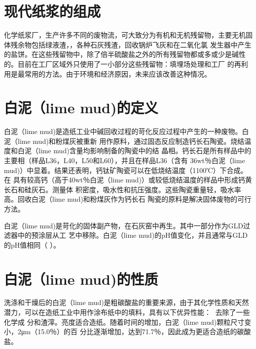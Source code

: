 \documentclass[11pt]{article}
\begin{document}
\section{现代纸浆的组成}
\label{sec:org1eb26ad}
化学纸浆厂，生产许多不同的废物流，可大致分为有机和无机残留物，主要无机固体残余物包括绿液渣，，各种石灰残渣，回收锅炉飞灰和在二氧化氯
发生器中产生的盐饼。在这些残留物中，除了倍半硫酸盐之外的所有残留物都或多或少是碱性
的。目前在工厂区域外只使用了一小部分这些残留物：填埋场处理和工厂
的再利用是最常用的方法。由于环境和经济原因，未来应该改善这种情况。\cite{Kinnarinen_2016}

\section{白泥（lime mud)的定义}
\label{sec:orgf60a219}
白泥（lime mud)是造纸工业中碱回收过程的苛化反应过程中产生的一种废物。白泥（lime mud)和粉煤灰被重新
用作原料，通过固态反应制造钙长石陶瓷。烧结温度和白泥（lime mud)含量均影响制备的陶瓷中的结
晶相。钙长石是所有样品中的主要相（样品L36，L40，L50和L60），并且在样品L36（含有
36wt％白泥（lime mud)）中显着。结果还表明，钙钛矿陶瓷可以在低烧结温度（1100℃）下合成。在
具有较高钙（高于40wt％白泥（lime mud)）或较低烧结温度的样品中形成钙黄长石和硅灰石。测量体
积密度，吸水性和抗压强度。这些陶瓷重量轻，吸水率高。回收白泥（lime mud)和粉煤灰作为钙长石
陶瓷的原料是解决固体废物的可行方法。 \cite{qin15_recyc_lime_mud_fly_ash}

白泥（lime mud)是苛化的固体副产物，在石灰窑中再生。其中一部分作为GLD过滤器中的预涂层从工
艺中移除。白泥（lime mud)的pH值变化，并且通常与GLD的pH值相同（
\cite{sthiannopkao09_utiliz_pulp_paper_indus_wastes}）。


\section{白泥（lime mud)的性质}
\label{sec:orga911ae8}
洗涤和干燥后的白泥（lime mud)是粗碳酸盐的重要来源，由于其化学性质和天然潜力，可以在造纸工业中用作涂布纸中的填料，具有以下优异性能： 去除了一些化学成
分和渣滓。亮度适合造纸。随着时间的增加，白泥（lime mud)颗粒尺寸变小，2μm（15.0％）的百
分比逐渐增加，达到71.7％，因此成为更适合造纸的碳酸盐。\cite{article}


\nocite{poykio14_evaluat_bio_acces_non_proces, maekitalo14_charac_green_liquor_dregs_poten, jia13_use_amend_tailin_as_mine_waste_cover
, jia14_metal_mobil_tailin_cover_with, edmondson14_urban_cultiv_allot_maint_soil, buruberri15_prepar_clink_from_paper_pulp_indus_wastes,
 brunelle15_evaluat_impac_risin_fertil_prices_crop_yield, andreola11_model_simul_analy_react_system,
  ragnvaldsson14_novel_method_reduc_acid_mine, zhang15_lime_mud_from_paper_proces, zhang14_anaer_diges_food_waste_stabil}
\end{document}
